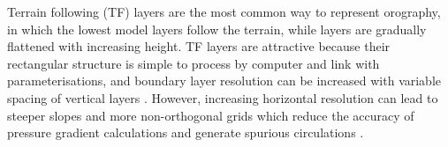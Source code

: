 \documentclass[a4paper]{article}
\begin{document}
Terrain following (TF) layers are the most common way to represent orography, in which the lowest model layers follow the terrain, while layers are gradually flattened with increasing height.  TF layers are attractive because their rectangular structure is simple to process by computer and link with parameterisations, and boundary layer resolution can be increased with variable spacing of vertical layers \citep{schaer2002}.
However, increasing horizontal resolution can lead to steeper slopes and more non-orthogonal grids which reduce the accuracy of pressure gradient calculations and generate spurious circulations \citep{dempsey-davis1998,klemp2011}.



                                                 

\end{document}
